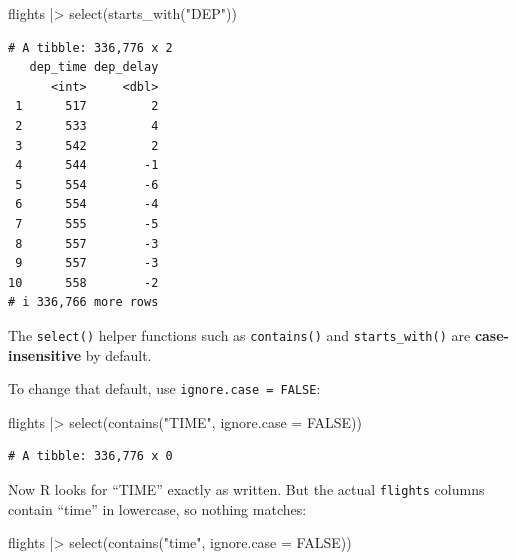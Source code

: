 \documentclass[
  letterpaper,
  DIV=11,
  numbers=noendperiod]{scrreprt}
\newenvironment{Shaded}{\begin{snugshade}}{\end{snugshade}}
\newcommand{\AttributeTok}[1]{\textcolor[rgb]{0.40,0.45,0.13}{#1}}
\newcommand{\ConstantTok}[1]{\textcolor[rgb]{0.56,0.35,0.01}{#1}}
\newcommand{\FunctionTok}[1]{\textcolor[rgb]{0.28,0.35,0.67}{#1}}
\newcommand{\NormalTok}[1]{\textcolor[rgb]{0.00,0.23,0.31}{#1}}
\newcommand{\SpecialCharTok}[1]{\textcolor[rgb]{0.37,0.37,0.37}{#1}}
\newcommand{\StringTok}[1]{\textcolor[rgb]{0.13,0.47,0.30}{#1}}
\begin{document}
\begin{Shaded}
\begin{Highlighting}[]
\NormalTok{flights }\SpecialCharTok{|\textgreater{}}
  \FunctionTok{select}\NormalTok{(}\FunctionTok{starts\_with}\NormalTok{(}\StringTok{"DEP"}\NormalTok{))}
\end{Highlighting}
\end{Shaded}

\begin{verbatim}
# A tibble: 336,776 x 2
   dep_time dep_delay
      <int>     <dbl>
 1      517         2
 2      533         4
 3      542         2
 4      544        -1
 5      554        -6
 6      554        -4
 7      555        -5
 8      557        -3
 9      557        -3
10      558        -2
# i 336,766 more rows
\end{verbatim}

The \texttt{select()} helper functions such as \texttt{contains()} and
\texttt{starts\_with()} are \textbf{case-insensitive} by default.

To change that default, use \texttt{ignore.case\ =\ FALSE}:

\begin{Shaded}
\begin{Highlighting}[]
\NormalTok{flights }\SpecialCharTok{|\textgreater{}}
  \FunctionTok{select}\NormalTok{(}\FunctionTok{contains}\NormalTok{(}\StringTok{"TIME"}\NormalTok{, }\AttributeTok{ignore.case =} \ConstantTok{FALSE}\NormalTok{))}
\end{Highlighting}
\end{Shaded}

\begin{verbatim}
# A tibble: 336,776 x 0
\end{verbatim}

Now R looks for ``TIME'' exactly as written. But the actual
\texttt{flights} columns contain ``time'' in lowercase, so nothing
matches:

\begin{Shaded}
\begin{Highlighting}[]
\NormalTok{flights }\SpecialCharTok{|\textgreater{}}
  \FunctionTok{select}\NormalTok{(}\FunctionTok{contains}\NormalTok{(}\StringTok{"time"}\NormalTok{, }\AttributeTok{ignore.case =} \ConstantTok{FALSE}\NormalTok{))}
\end{Highlighting}
\end{Shaded}
\end{document}
